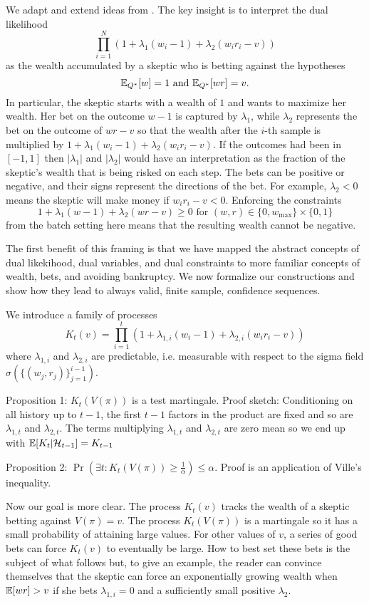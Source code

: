 We adapt and extend ideas from \cite{waudby-smith_variance-adaptive_2020}.
The key insight is to interpret the dual likelihood
\[
\prod_{i=1}^N (1+\lambda_1(w_i-1)+\lambda_2(w_i r_i - v))
\]
as the wealth accumulated by a skeptic who is betting against the
hypotheses 
\[
\mathbb{E}_{Q^*}[w]=1 \text{ and } \mathbb{E}_{Q^*}[wr]=v.
\]
In particular,
the skeptic starts with a wealth of $1$ and wants to 
maximize her wealth. Her bet on the outcome $w-1$ is captured by $\lambda_1$, while $\lambda_2$
represents the bet on the outcome of $wr-v$ so that the wealth after
the $i$-th sample is multiplied by $1+\lambda_1(w_i-1)+\lambda_2 (w_i r_i -v)$. If the outcomes had been in $[-1,1]$ then
$|\lambda_1|$ and $|\lambda_2|$ would have an interpretation as 
the fraction of the skeptic's wealth that is being risked 
on each step. The bets can be positive
or negative, and their signs represent the directions of the bet. For example, $\lambda_2<0$ means 
the skeptic will make money if $w_ir_i-v<0$.
Enforcing the constraints 
\[
1+\lambda_{1} (w-1)+\lambda_{2} (wr-v)\geq 0 
\textrm{ for } (w,r) \in \{0,w_{\max}\}\times\{0,1\}
\]
from the batch setting here means that 
the resulting wealth cannot be negative.

The first
benefit of this framing is that we have 
mapped the abstract concepts of dual likekihood,
dual variables, and dual constraints to more familiar 
concepts of wealth, bets, and avoiding bankruptcy. 
We now formalize our constructions and
show how they lead to always valid, finite sample, 
confidence sequences.

We introduce a family of processes
\[
K_t(v) = \prod_{i=1}^t (1+\lambda_{1,i} (w_i-1) +\lambda_{2,i}(w_i r_i - v))
\]
where $\lambda_{1,i}$ and $\lambda_{2,i}$ are predictable, i.e. measurable
with respect to the sigma field $\sigma(\{(w_j,r_j)\}_{j=1}^{i-1})$.

Proposition 1: $K_t(V(\pi))$ is a test martingale. Proof sketch:
Conditioning on all history up to 
$t-1$, the first $t-1$ factors in the product are fixed and so are $\lambda_{1,t}$ and $\lambda_{2,t}$. The terms multiplying $\lambda_{1,t}$ and $\lambda_{2,t}$ are zero mean
so we end up with $\mathbb{E}[K_t|\mathcal{H}_{t-1}] = K_{t-1}$

Proposition 2: $\Pr(\exists t: K_t(V(\pi)) \geq \frac{1}{\alpha})\leq \alpha$. Proof is an application of Ville's inequality.

Now our goal is more clear. The process $K_t(v)$ tracks the wealth
of a skeptic betting against
$V(\pi)=v$. The process $K_t(V(\pi))$ is a martingale so it has
a small probability of attaining large values. For other values 
of $v$, a series of good bets can force $K_t(v)$ to eventually
be large. How to best set these bets is the subject of what follows
but, to give an example, the reader can convince themselves that 
the skeptic can force an exponentially growing wealth when $\mathbb{E}[wr]>v$ 
if she bets $\lambda_{1,i}=0$ and a sufficiently small positive $\lambda_2$. 

